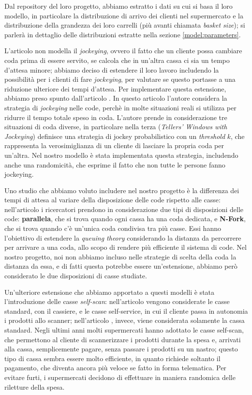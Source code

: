 Dal repository del loro progetto, abbiamo estratto i dati su cui si basa il loro modello, in particolare la distribuzione di arrivo dei clienti nel supermercato e la distribuzione della grandezza dei loro carrelli (più avanti chiamata \textit{basket size}); si parlerà in dettaglio delle distribuzioni estratte nella sezione \ref{model:parameters}.

L'articolo \cite{article1} non modella il \textit{jockeying}, ovvero il fatto che un cliente possa cambiare coda prima di essere servito, se calcola che in un'altra cassa ci sia un tempo d'attesa minore; abbiamo deciso di estendere il loro lavoro includendo la possibilità per i clienti di fare \textit{jockeying}, per valutare se questo portasse a una riduzione ulteriore dei tempi d'attesa. Per implementare questa estensione, abbiamo preso spunto dall'articolo \cite{koenigsberg1966jockeying}.
In questo articolo l'autore considera la strategia di \textit{jockeying} nelle code, perchè in molte situazioni reali si utilizza per ridurre il tempo totale speso in coda. L'autore prende in considerazione tre situazioni di coda diverse, in particolare nella terza (\textit{Tellers' Windows with Jockeying}) definisce una strategia di jockey probabilistico con un \textit{threshold} $k$, che rappresenta la verosimiglianza di un cliente di lasciare la propria coda per un'altra. Nel nostro modello è stata implementata questa strategia, includendo anche una randomicità, che esprime il fatto che non tutte le persone fanno jockeying.

Uno studio che abbiamo voluto includere nel nostro progetto è la differenza dei tempi di attesa al variare della disposizione delle code rispetto alle casse: nell'articolo \cite{yanagisawa2011methods} i ricercatori prendono in considerazione due tipi di disposizioni delle code: \textbf{parallela}, che si trova quando ogni cassa ha una coda dedicata, e \textbf{N-Fork}, che si trova quando c'è un'unica coda condivisa tra più casse. Essi hanno l'obiettivo di estendere la \textit{queuing theory} considerando la distanza da percorrere per arrivare a una coda, allo scopo di rendere più efficiente il sistema di code. Nel nostro progetto, noi non abbiamo incluso nelle strategie di scelta della coda la distanza da essa, e di fatti questa potrebbe essere un'estensione, abbiamo però considerato le due disposizioni di casse studiate. 

Un'ulteriore estensione che abbiamo apportato a questi modelli è stata
l'introduzione delle casse \textit{self-scan}: nell'articolo
\cite{article1} vengono considerate le casse standard, con il
cassiere, e le casse self-service, in cui il cliente passa in
autonomia i prodotti allo scanner; nell'articolo
\cite{yanagisawa2011methods}, invece, viene considerata solamente la
cassa standard. Negli ultimi anni molti supermercati hanno adottato le
casse self-scan, che permettono al cliente di scannerizzare i prodotti
durante la spesa e, arrivati alla cassa, semplicemente pagare, senza
passare i prodotti su un nastro; questo tipo di cassa sembra essere
molto efficiente, in quanto richiede soltanto il pagamento, che
diventa ancora più veloce se fatto in forma telematica. Per evitare
furti, i supermercati decidono di effettuare in maniera randomica
delle riletture della spesa.

